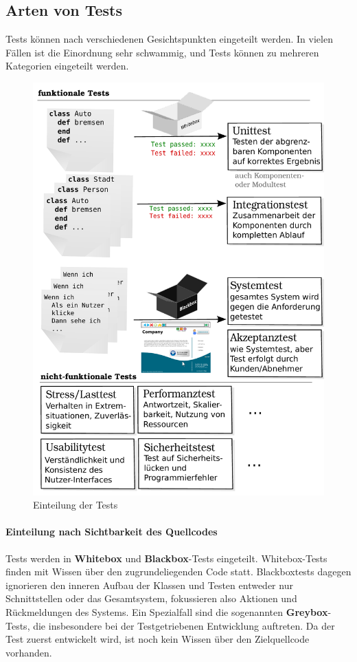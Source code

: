 
\subsection{Arten von Tests}
Tests können nach verschiedenen Gesichtspunkten eingeteilt werden. In vielen Fällen ist die Einordnung sehr schwammig, und Tests können zu mehreren Kategorien eingeteilt werden.
\begin{figure}[hp]
 \centering
 \includegraphics[width=\textwidth]{./diagrams/testarten.pdf}
 \caption{Einteilung der Tests}
 \label{fig:testArten}
\end{figure}

\paragraph{Einteilung nach Sichtbarkeit des Quellcodes} Tests werden in \textbf{Whitebox} und \textbf{Blackbox}-Tests eingeteilt. Whitebox-Tests finden mit Wissen über den zugrundeliegenden Code statt. Blackboxtests dagegen ignorieren den inneren Aufbau der Klassen und Testen entweder nur Schnittstellen oder das Gesamtsystem, fokussieren also Aktionen und Rückmeldungen des Systems.
Ein Spezialfall sind die sogenannten \textbf{Greybox}-Tests, die insbesondere bei der Testgetriebenen Entwicklung auftreten. Da der Test zuerst entwickelt wird, ist noch kein Wissen über den Zielquellcode vorhanden.

